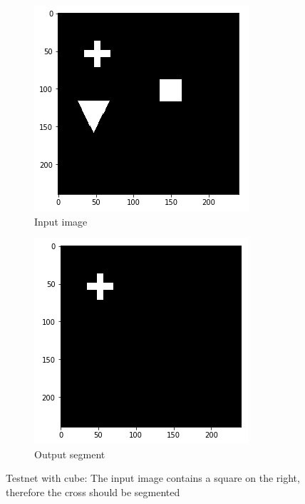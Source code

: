\begin{figure}[H]
    \centering
    \begin{subfigure}[t]{.5\textwidth}
        \centering
        \includegraphics[width=\linewidth]{chapters/05_testnet/images/testnet_b-0.png}
        \caption{Input image}
    \end{subfigure}%
    \begin{subfigure}[t]{.5\textwidth}
        \centering
        \includegraphics[width=\linewidth]{chapters/05_testnet/images/testnet_b-1.png}
        \caption{Output segment}
    \end{subfigure}
    \caption{Testnet with cube: The input image contains a square on the right, therefore the cross should be segmented}
    \label{testnet_example_2}
\end{figure}

